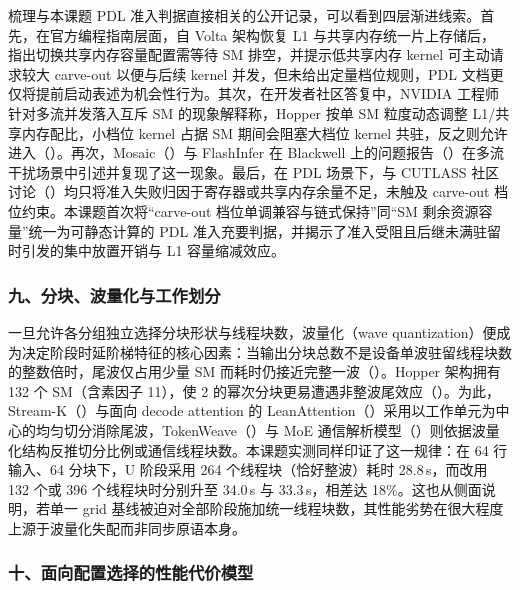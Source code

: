 梳理与本课题 PDL 准入判据直接相关的公开记录，可以看到四层渐进线索。首先，在官方编程指南层面，自 Volta 架构恢复 L1 与共享内存统一片上存储后， 指出切换共享内存容量配置需等待 SM 排空，并提示低共享内存 kernel 可主动请求较大 carve-out 以便与后续 kernel 并发，但未给出定量档位规则，PDL 文档更仅将提前启动表述为机会性行为。其次，在开发者社区答复中，NVIDIA 工程师针对多流并发落入互斥 SM 的现象解释称，Hopper 按单 SM 粒度动态调整 L1/共享内存配比，小档位 kernel 占据 SM 期间会阻塞大档位 kernel 共驻，反之则允许进入（）。再次，Mosaic（）与 FlashInfer 在 Blackwell 上的问题报告（）在多流干扰场景中引述并复现了这一现象。最后，在 PDL 场景下，\cQiang 与 CUTLASS 社区讨论（）均只将准入失败归因于寄存器或共享内存余量不足，未触及 carve-out 档位约束。本课题首次将“carve-out 档位单调兼容与链式保持”同“SM 剩余资源容量”统一为可静态计算的 PDL 准入充要判据，并揭示了准入受阻且后继未满驻留时引发的集中放置开销与 L1 容量缩减效应。

\subsubsection*{九、分块、波量化与工作划分}

一旦允许各分组独立选择分块形状与线程块数，波量化（wave quantization）便成为决定阶段时延阶梯特征的核心因素：当输出分块总数不是设备单波驻留线程块数的整数倍时，尾波仅占用少量 SM 而耗时仍接近完整一波（）。Hopper 架构拥有 132 个 SM（含素因子 11），使 2 的幂次分块更易遭遇非整波尾效应（）。为此，Stream-K（）与面向 decode attention 的 LeanAttention（）采用以工作单元为中心的均匀切分消除尾波，TokenWeave（）与 MoE 通信解析模型（）则依据波量化结构反推切分比例或通信线程块数。本课题实测同样印证了这一规律：在 64 行输入、64 分块下，U 阶段采用 264 个线程块（恰好整波）耗时 28.8\,\textmu s，而改用 132 个或 396 个线程块时分别升至 34.0\,\textmu s 与 33.3\,\textmu s，相差达 18\%。这也从侧面说明，若单一 grid 基线被迫对全部阶段施加统一线程块数，其性能劣势在很大程度上源于波量化失配而非同步原语本身。

\subsubsection*{十、面向配置选择的性能代价模型}

